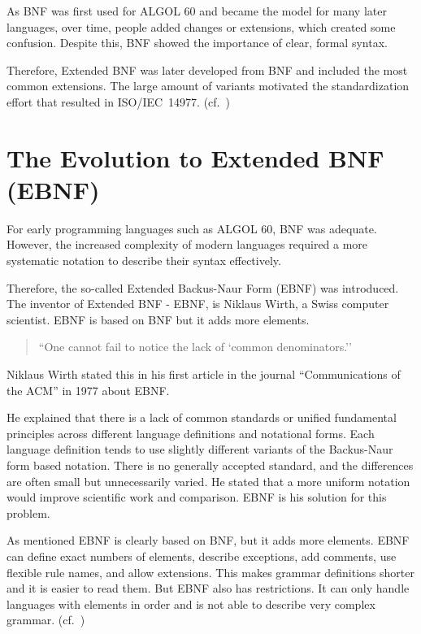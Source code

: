 As BNF was first used for ALGOL 60 and became the model for many later languages, over time, people added changes or extensions, which created some confusion. Despite this, BNF showed the importance of clear, formal syntax.

Therefore, Extended BNF was later developed from BNF and included the most common extensions. The large amount of variants motivated the standardization effort that resulted in ISO/IEC~14977. (cf.~\cite[p.~V]{ISO/IEC149771996InformationBNF})

\section{The Evolution to Extended BNF (EBNF)}

For early programming languages such as ALGOL 60, BNF was adequate. However, the increased complexity of modern languages required a more systematic notation to describe their syntax effectively.

Therefore, the so-called Extended Backus-Naur Form (EBNF) was introduced. The inventor of Extended BNF - EBNF, is Niklaus Wirth, a Swiss computer scientist. EBNF is based on BNF but it adds more elements.

\begin{quote}
``One cannot fail to notice the lack of `common denominators.''
\end{quote}

Niklaus Wirth stated this in his first article in the journal ``Communications of the ACM'' in 1977 about EBNF. \cite{Wirth1977WhatDefinitions}

He explained that there is a lack of common standards or unified fundamental principles across different language definitions and notational forms. Each language definition tends to use slightly different variants of the Backus-Naur form based notation. There is no generally accepted standard, and the differences are often small but unnecessarily varied. He stated that a more uniform notation would improve scientific work and comparison. EBNF is his solution for this problem. 

As mentioned EBNF is clearly based on BNF, but it adds more elements. EBNF can define exact numbers of elements, describe exceptions, add comments, use flexible rule names, and allow extensions. This makes grammar definitions shorter and it is easier to read them. But EBNF also has restrictions. It can only handle languages with elements in order and is not able to describe very complex grammar. (cf.~\cite[pp.~VII-VIII]{ISO/IEC149771996InformationBNF})


